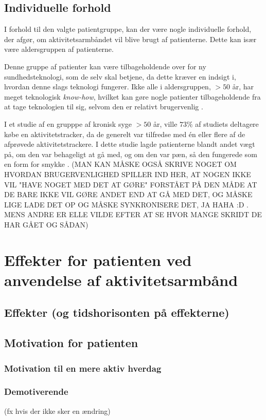 \subsection{Individuelle forhold}
I forhold til den valgte patientgruppe, kan der være nogle individuelle forhold, der afgør, om aktivitetsarmbåndet vil blive brugt af patienterne. Dette kan især være aldersgruppen af patienterne. 

Denne gruppe af patienter kan være tilbageholdende over for ny sundhedsteknologi, som de selv skal betjene, da dette kræver en indsigt i, hvordan denne slags teknologi fungerer. Ikke alle i aldersgruppen, $>50$ år, har meget teknologisk \textit{know-how}, hvilket kan gøre nogle patienter tilbageholdende fra at tage teknologien til sig, selvom den er relativt brugervenlig \citep{mercer2016}. 

I et studie af en grupppe af kronisk syge $>50$ år, ville $73 \%$ af studiets deltagere købe en aktivitetstracker, da de generelt var tilfredse med én eller flere af de afprøvede aktivitetstrackere. I dette studie lagde patienterne blandt andet vægt på, om den var behageligt at gå med, og om den var pæn, så den fungerede som en form for smykke \citep{mercer2016}.
(MAN KAN MÅSKE OGSÅ SKRIVE NOGET OM HVORDAN BRUGERVENLIGHED SPILLER IND HER, AT NOGEN IKKE VIL "HAVE NOGET MED DET AT GØRE" FORSTÅET PÅ DEN MÅDE AT DE BARE IKKE VIL GØRE ANDET END AT GÅ MED DET, OG MÅSKE LIGE LADE DET OP OG MÅSKE SYNKRONISERE DET, JA HAHA :D . MENS ANDRE ER ELLE VILDE EFTER AT SE HVOR MANGE SKRIDT DE HAR GÅET OG SÅDAN)
\section{Effekter for patienten ved anvendelse af aktivitetsarmbånd}
\subsection{Effekter (og tidshorisonten på effekterne)}
\subsection{Motivation for patienten}
\subsubsection{Motivation til en mere aktiv hverdag}
\subsubsection{Demotiverende}
(fx hvis der ikke sker en ændring)

